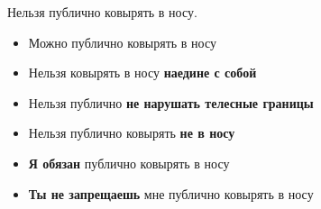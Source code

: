 \documentclass[aspectratio=169]{beamer}
\begin{document}
\begin{frame}
Нельзя публично ковырять в носу.
\begin{itemize}
\item<2> Можно публично ковырять в носу
\item<3-> Нельзя ковырять в носу {\bf наедине с собой}
\item<4-> Нельзя публично {\bf не нарушать телесные границы}
\item<5-> Нельзя публично ковырять {\bf не в носу}
\item<6-> {\bf Я обязан} публично ковырять в носу
\item<7-> {\bf Ты не запрещаешь} мне публично ковырять в носу
\end{itemize}
\end{frame}

\begin{frame}

\end{frame}
\end{document}
